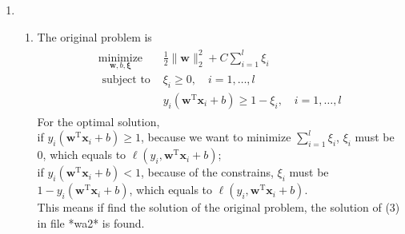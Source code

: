 \documentclass[a4paper]{article}
\begin{document}
\begin{enumerate}
\item 
\begin{enumerate}
  \item The original problem is
  \begin{equation*}
    \begin{aligned}
    \begin{array}{cl}{\underset{\boldsymbol{w}, b, \boldsymbol{\xi}}{\operatorname{minimize}}} & {\frac{1}{2}\|\boldsymbol{w}\|_{2}^{2}+C \sum_{i=1}^{l} \xi_{i}} \\ 
    {\text { subject to }} & {\xi_{i} \geq 0, \quad i=1, \ldots, l} \\
    {} & {y_{i}\left(\boldsymbol{w}^{\mathrm{T}} \boldsymbol{x}_{i}+b\right) \geq 1-\xi_{i}, \quad i=1, \ldots, l}\end{array}
    \end{aligned}
  \end{equation*}
  For the optimal solution, \\
  if $y_{i}\left(\boldsymbol{w}^{\mathrm{T}} \boldsymbol{x}_{i}+b\right) \geq 1$, because we want to minimize $\sum_{i=1}^{l} \xi_{i}$, $\xi_{i}$ must be 0, which equals to $\ell\left(y_{i}, \boldsymbol{w}^{\mathrm{T}} \boldsymbol{x}_{i}+b\right)$;\\
  if $y_{i}\left(\boldsymbol{w}^{\mathrm{T}} \boldsymbol{x}_{i}+b\right) < 1$, because of the constrains, $\xi_{i}$ must be $1-y_{i}\left(\boldsymbol{w}^{\mathrm{T}} \boldsymbol{x}_{i}+b\right)$, which equals to $\ell\left(y_{i}, \boldsymbol{w}^{\mathrm{T}} \boldsymbol{x}_{i}+b\right)$.\\
  This means if find the solution of the original problem, the solution of (3) in file *wa2* is found.

\end{enumerate}
\end{enumerate}
\end{document}
